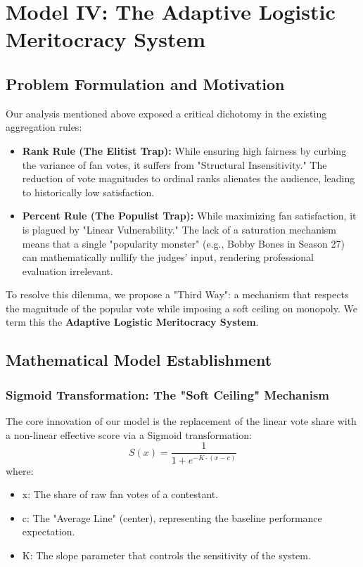 \section{Model IV: The Adaptive Logistic Meritocracy System}

\subsection{Problem Formulation and Motivation}
Our analysis mentioned above exposed a critical dichotomy in the existing aggregation rules:
\begin{itemize}
\item \textbf{Rank Rule (The Elitist Trap):} While ensuring high fairness by curbing the variance of fan votes, it suffers from "Structural Insensitivity." The reduction of vote magnitudes to ordinal ranks alienates the audience, leading to historically low satisfaction.
\item \textbf{Percent Rule (The Populist Trap):} While maximizing fan satisfaction, it is plagued by "Linear Vulnerability." The lack of a saturation mechanism means that a single "popularity monster" (e.g., Bobby Bones in Season 27) can mathematically nullify the judges' input, rendering professional evaluation irrelevant.
\end{itemize}

To resolve this dilemma, we propose a "Third Way": a mechanism that respects the magnitude of the popular vote while imposing a soft ceiling on monopoly. We term this the \textbf{Adaptive Logistic Meritocracy System}.

\subsection{Mathematical Model Establishment}

\subsubsection{Sigmoid Transformation: The "Soft Ceiling" Mechanism}
The core innovation of our model is the replacement of the linear vote share  with a non-linear effective score  via a Sigmoid transformation:
\begin{equation}
S(x) = \frac{1}{1 + e^{-K \cdot (x - c)}}
\end{equation}
where:
\begin{itemize}
\item $\mathrm{x}$: The share of raw fan votes of a contestant.
\item $\mathrm{c}$: The "Average Line" (center), representing the baseline performance expectation.
\item $\mathrm{K}$: The slope parameter that controls the sensitivity of the system.
\end{itemize}

